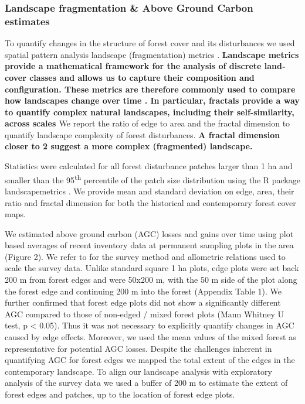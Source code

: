 \documentclass[remote sensing,article,submit,moreauthors,pdftex]{mdpi}
\begin{document}
\hypertarget{landscape-fragmentation-above-ground-carbon-estimates}{%
\subsubsection{Landscape fragmentation \& Above Ground Carbon
estimates}\label{landscape-fragmentation-above-ground-carbon-estimates}}

To quantify changes in the structure of forest cover and its
disturbances we used spatial pattern analysis landscape (fragmentation)
metrics \citep{dale1999}. \textbf{Landscape metrics provide a
mathematical framework for the analysis of discrete land‐cover classes
and allows us to capture their composition and configuration. These
metrics are therefore commonly used to compare how landscapes change
over time \citep{hesselbarth2019}. In particular, fractals provide a way
to quantify complex natural landscapes, including their self-similarity,
across scales \citep{Li2000, Mandelbrot1977}} We report the ratio of
edge to area and the fractal dimension to quantify landscape complexity
of forest disturbances. \textbf{A fractal dimension closer to 2 suggest
a more complex (fragmented) landscape.}

Statistics were calculated for all forest disturbance patches larger
than 1 ha and smaller than the 95\textsuperscript{th} percentile of the
patch size distribution using the R package landscapemetrics
\citep{hesselbarth2019}. We provide mean and standard deviation on edge,
area, their ratio and fractal dimension for both the historical and
contemporary \citet{hansen2013} forest cover maps.

We estimated above ground carbon (AGC) losses and gains over time using
plot based averages of recent inventory data at permanent sampling plots
in the area (Figure 2). We refer to \citet{Kearsley2013} for the survey
method and allometric relations used to scale the survey data. Unlike
standard square 1 ha plots, edge plots were set back 200 m from forest
edges and were 50x200 m, with the 50 m side of the plot along the forest
edge and continuing 200 m into the forest (Appendix Table 1). We further
confirmed that forest edge plots did not show a significantly different
AGC compared to those of non-edged / mixed forest plots (Mann Whitney U
test, p \textless{} 0.05). Thus it was not necessary to explicitly
quantify changes in AGC caused by edge effects. Moreover, we used the
mean values of the mixed forest as representative for potential AGC
losses. Despite the challenges inherent in quantifying AGC for forest
edges we mapped the total extent of the edges in the contemporary
landscape. To align our landscape analysis with exploratory analysis of
the survey data we used a buffer of 200 m to estimate the extent of
forest edges and patches, up to the location of forest edge plots.
\end{document}
